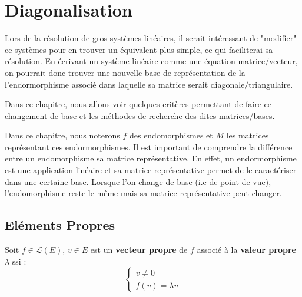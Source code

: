 
\chapter{Diagonalisation}

\justify

\setlength{\parindent}{0pt}


Lors de la résolution de gros systèmes linéaires, il serait intéressant de "modifier" ce systèmes pour en trouver un équivalent plus simple, 
ce qui faciliterai sa résolution. 
En écrivant un système linéaire comme une équation matrice/vecteur, on pourrait donc trouver une nouvelle base de représentation de 
la l'endormorphisme associé dans laquelle sa matrice serait diagonale/triangulaire. 

Dans ce chapitre, nous allons voir quelques critères permettant de faire ce changement de base et les méthodes de recherche des dites matrices/bases. 

\begin{remark}[Notation]
    Dans ce chapitre, nous noterons $f$ des endomorphismes et $M$ les matrices représentant ces endormorphismes. 
    Il est important de comprendre la différence entre un endomorphisme sa matrice représentative. 
    En effet, un endormorphisme est une application linéaire et sa matrice représentative permet de le caractériser dans une certaine base. 
    Lorsque l'on change de base (i.e de point de vue), l'endomorphisme reste le même mais sa matrice représentative peut changer. 
\end{remark}


\section{Eléments Propres}

\begin{definition}
    Soit $ f \in \mathcal{L}(E)$, $v \in E$ est un \textbf{vecteur propre} de $f$ associé à la \textbf{valeur propre} $\lambda$ ssi :
    \[ 
        \begin{cases}
            v \not = 0 \\
            f(v) = \lambda v
        \end{cases}
    \]
\end{definition}

